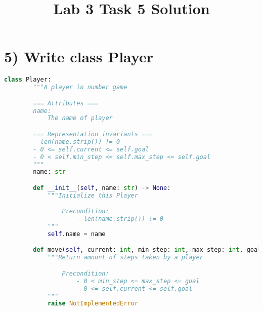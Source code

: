 \documentclass[12pt]{article}
\begin{document}
\title{Lab 3 Task 5 Solution}
\date{}
\maketitle

\section*{5) Write class Player}

\begin{lstlisting}[language=Python, caption={task\_5\_solution.py},captionpos=b]
    class Player:
        """A player in number game

        === Attributes ===
        name:
            The name of player

        === Representation invariants ===
        - len(name.strip()) != 0
        - 0 <= self.current <= self.goal
        - 0 < self.min_step <= self.max_step <= self.goal
        """
        name: str

        def __init__(self, name: str) -> None:
            """Initialize this Player

                Precondition:
                    - len(name.strip()) != 0
            """
            self.name = name

        def move(self, current: int, min_step: int, max_step: int, goal: int) -> int:
            """Return amount of steps taken by a player

                Precondition:
                    - 0 < min_step <= max_step <= goal
                    - 0 <= self.current <= self.goal
            """
            raise NotImplementedError
\end{lstlisting}
\end{document}
